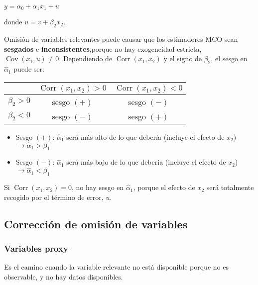 \documentclass[10pt, a4paper, landscape]{article}
\DeclareMathOperator{\Cov}{Cov}
\DeclareMathOperator{\Corr}{Corr}
\begin{document}
\begin{multicols}{3}
\begin{center}
	\( y = \alpha_{0} + \alpha_{1} x_{1} + u \)
\end{center}

\quad donde \( u = v + \beta_{2} x_{2} \).

Omisión de variables relevantes puede causar que los estimadores MCO sean \textbf{sesgados} e \textbf{inconsistentes},porque no hay exogeneidad estricta, \( \Cov(x_{1}, u) \neq 0 \). Dependiendo de \( \Corr(x_{1}, x_{2}) \) y el signo de \( \beta_{2} \), el sesgo en \( \hat{\alpha}_{1} \) puede ser:

\begin{center}
	\begin{tabular}{ c | c c }
		                    & \( \Corr(x_{1}, x_{2}) > 0 \) & \( \Corr(x_{1}, x_{2}) < 0 \) \\ \hline
		\( \beta_{2} > 0 \) & sesgo \( (+) \)               & sesgo \( (-) \)               \\
		\( \beta_{2} < 0 \) & sesgo \( (-) \)               & sesgo \( (+) \)
	\end{tabular}
\end{center}

\begin{itemize}[leftmargin=*]
	\item Sesgo \( (+) \): \( \hat{\alpha}_{1} \) será más alto de lo que debería (incluye el efecto de \( x_{2} \)) \( \rightarrow \hat{\alpha}_{1} > \beta_{1} \)
	\item Sesgo \( (-) \): \( \hat{\alpha}_{1} \) será más bajo de lo que debería (incluye el efecto de \( x_{2} \)) \( \rightarrow \hat{\alpha}_{1} < \beta_{1} \)
\end{itemize}

Si \( \Corr(x_{1}, x_{2}) = 0 \), no hay sesgo en \( \hat{\alpha}_{1} \), porque el efecto de \( x_{2} \) será totalmente recogido por el término de error, \( u \).

\columnbreak

\subsection*{Corrección de omisión de variables}

\subsubsection*{Variables proxy}

Es el camino cuando la variable relevante no está disponible porque no es observable, y no hay datos disponibles.


\end{multicols}
\end{document}

